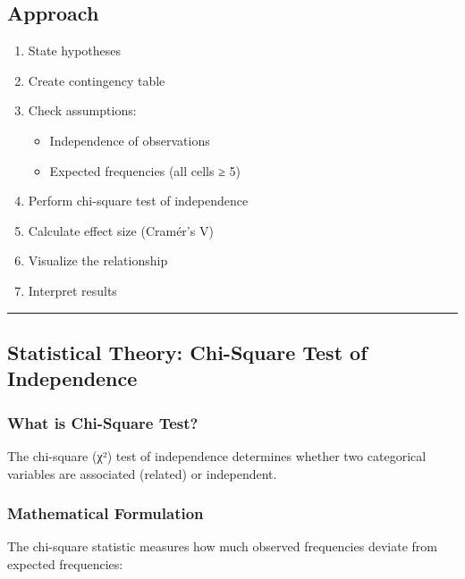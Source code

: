 \documentclass[11pt]{article}
\providecommand{\tightlist}{%
      \setlength{\itemsep}{0pt}\setlength{\parskip}{0pt}}
\begin{document}
\subsection{Approach}\label{approach}

\begin{enumerate}
\def\labelenumi{\arabic{enumi}.}
\tightlist
\item
  State hypotheses
\item
  Create contingency table
\item
  Check assumptions:

  \begin{itemize}
  \tightlist
  \item
    Independence of observations
  \item
    Expected frequencies (all cells ≥ 5)
  \end{itemize}
\item
  Perform chi-square test of independence
\item
  Calculate effect size (Cramér's V)
\item
  Visualize the relationship
\item
  Interpret results
\end{enumerate}

\begin{center}\rule{0.5\linewidth}{0.5pt}\end{center}

    \subsection{Statistical Theory: Chi-Square Test of
Independence}\label{statistical-theory-chi-square-test-of-independence}

\subsubsection{What is Chi-Square Test?}\label{what-is-chi-square-test}

The chi-square (χ²) test of independence determines whether two
categorical variables are associated (related) or independent.

\subsubsection{Mathematical Formulation}\label{mathematical-formulation}

The chi-square statistic measures how much observed frequencies deviate
from expected frequencies:
\end{document}
